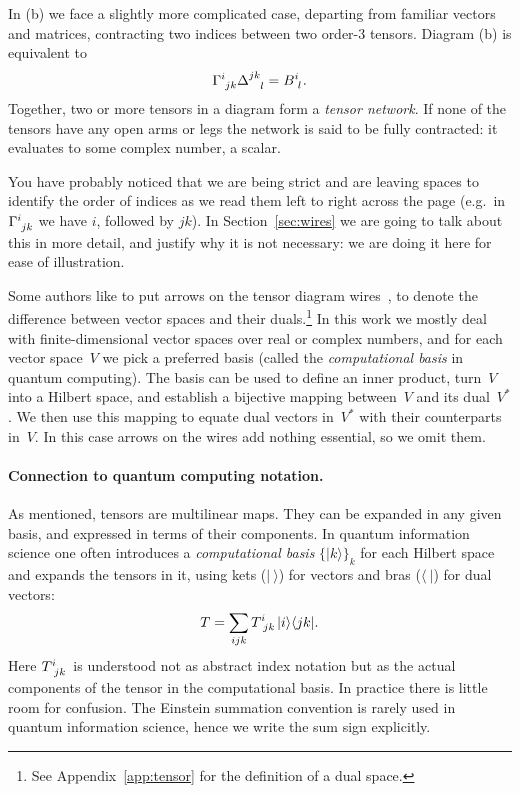 \documentclass[aps,pra,12pt,nofootinbib,superscriptaddress,longbibliography]{revtex4-1}
\theoremstyle{plain}
\theoremstyle{definition}
\newcommand{\bra}[1]{\mbox{$\langle #1|$}}
\newcommand{\ket}[1]{\mbox{$|#1\rangle$}}
\newcommand{\be}{\begin{equation}}
\newcommand{\ee}{\end{equation}}
\begin{document}
In (b) we face a slightly more complicated
case, departing from familiar vectors and matrices, contracting two
indices between two order-3 tensors. Diagram (b)
is equivalent to
\begin{equation}
 \Gamma\indices{^i_{jk}} \Delta\indices{^{jk}_{l}} = B\indices{^i_l}.
\end{equation}
Together, two or more tensors in a diagram form a \emph{tensor network}.
If none of the tensors have any open arms or legs
the network is said to be fully contracted: it evaluates to some
complex number, a scalar.


You have probably noticed that we are being strict and are leaving spaces to
identify the order of indices as we read them left to right across the
page (e.g.~in $\Gamma\indices{^{i}_{jk}}$ we have $i$, followed by $jk$).
In Section~\ref{sec:wires} we are going to talk about this in more detail,
and justify why it is not necessary: we are doing it here for ease of
illustration.

Some authors like to put arrows on the tensor diagram wires~\cite{2009arXiv0908.2469B},
to denote the difference between vector spaces and their duals.\footnote{See Appendix~\ref{app:tensor} for the definition of a dual space.}
In this work we mostly deal with finite-dimensional vector spaces over real or complex numbers,
and for each vector space~$V$ we pick a preferred basis (called the \emph{computational basis} in quantum computing).
The basis can be used to define an inner product,
turn~$V$ into a Hilbert space,
and establish a bijective mapping between~$V$ and its dual~$V^*$.
We then use this mapping to equate dual vectors in~$V^*$ with their counterparts in~$V$.
In this case arrows on the wires add nothing essential, so we omit them.

\paragraph{{\bf Connection to quantum computing notation.}}
As mentioned, tensors are multilinear maps.
They can be expanded in any given basis, and expressed in
terms of their components.
In quantum information science one often introduces a \emph{computational basis}
$\{\ket{k}\}_k$
for each Hilbert space
and expands the tensors in it, using kets ($\ket{~}$) for vectors and bras ($\bra{~}$) for dual vectors:
\be 
T = \sum_{ijk}T\indices{^i_{jk}}\ket{i}\bra{jk}.
\ee 
Here $T\indices{^i_{jk}}$ is understood
not as abstract index notation but as the actual components of the
tensor in the computational basis.
In practice there is little room for confusion.
The Einstein summation convention is rarely used in quantum information science,
hence we write the sum sign explicitly.
\end{document}
